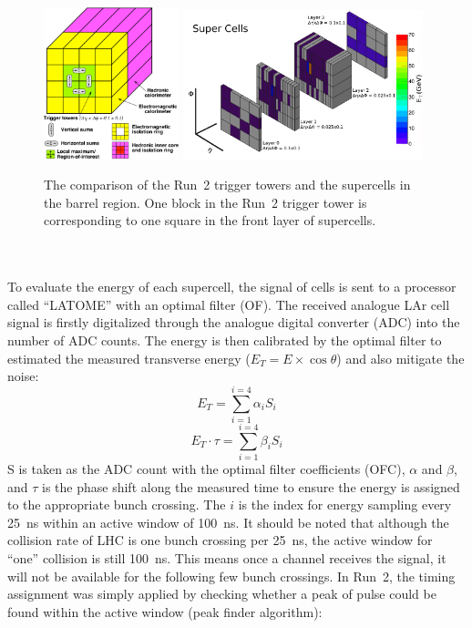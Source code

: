 \begin{figure}[!h]                
	\includegraphics[width=0.35\textwidth]{Chapter6/Run2TT.pdf}
	\includegraphics[width=0.62\textwidth]{Chapter6/Supercell.png}
	\begin{center}
		\caption{The comparison of the Run~2 trigger towers\cite{Aleksa:1602230} and the supercells\cite{Aaboud:2016leb} in the barrel region. One block in the Run~2 trigger tower is corresponding to one square in the front layer of supercells. }
		\label{Fig:tt_compar}            
	\end{center}
\end{figure}
\noindent
\\
\\To evaluate the energy of each supercell, the signal of cells is sent to a processor called ``LATOME'' with an optimal filter (OF). The received analogue LAr cell signal is firstly digitalized through the analogue digital converter (ADC) into the number of ADC counts. The energy is then calibrated by the optimal filter to estimated the measured transverse energy ($E_{T}=E\times\cos\theta$) and also mitigate the noise:
\begin{equation}
\label{Eq:get_Et}
E_{T}=\displaystyle\sum_{i=1}^{i=4}\alpha_{i}S_{i}
\end{equation}
\begin{equation}
\label{Eq:get_tau}
E_{T}\cdot\tau=\displaystyle\sum_{i=1}^{i=4}\beta_{i}S_{i}
\end{equation}
\noindent
S is taken as the ADC count with the optimal filter coefficients (OFC), $\alpha$ and $\beta$, and $\tau$ is the phase shift along the measured time to ensure the energy is assigned to the appropriate bunch crossing. The $i$ is the index for energy sampling every 25~ns within an active window of 100~ns. It should be noted that although the collision rate of LHC is one bunch crossing per 25~ns, the active window for ``one'' collision is still 100~ns. This means once a channel receives the signal, it will not be available for the following few bunch crossings. In Run~2, the timing assignment was simply applied by checking whether a peak of pulse could be found within the active window\cite{Jongmanns:2661780} (peak finder algorithm):
